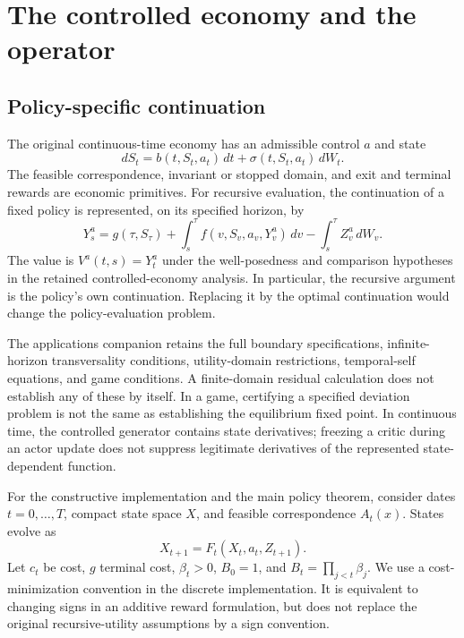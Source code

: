\documentclass[ecta,nameyear,draft]{econsocart}
\begin{document}
\section{The controlled economy and the operator}\label{sec:economy}
\subsection{Policy-specific continuation}
The original continuous-time economy has an admissible control $a$ and state
\begin{equation}\label{eq:diffusion}
 dS_t=b(t,S_t,a_t)\,dt+\sigma(t,S_t,a_t)\,dW_t.
\end{equation}
The feasible correspondence, invariant or stopped domain, and exit and terminal rewards are economic primitives. For recursive evaluation, the continuation of a fixed policy is represented, on its specified horizon, by
\[
 Y_s^a=g(\tau,S_\tau)+\int_s^\tau f(v,S_v,a_v,Y_v^a)\,dv
                 -\int_s^\tau Z_v^a\,dW_v.
\]
The value is $V^a(t,s)=Y_t^a$ under the well-posedness and comparison hypotheses in the retained controlled-economy analysis. In particular, the recursive argument is the policy's own continuation. Replacing it by the optimal continuation would change the policy-evaluation problem.

The applications companion retains the full boundary specifications, infinite-horizon transversality conditions, utility-domain restrictions, temporal-self equations, and game conditions. A finite-domain residual calculation does not establish any of these by itself. In a game, certifying a specified deviation problem is not the same as establishing the equilibrium fixed point. In continuous time, the controlled generator contains state derivatives; freezing a critic during an actor update does not suppress legitimate derivatives of the represented state-dependent function.

For the constructive implementation and the main policy theorem, consider dates $t=0,\ldots,T$, compact state space $X$, and feasible correspondence $A_t(x)$. States evolve as
\begin{equation}\label{eq:transition}
 X_{t+1}=F_t(X_t,a_t,Z_{t+1}).
\end{equation}
Let $c_t$ be cost, $g$ terminal cost, $\beta_t>0$, $B_0=1$, and $B_t=\prod_{j<t}\beta_j$. We use a cost-minimization convention in the discrete implementation. It is equivalent to changing signs in an additive reward formulation, but does not replace the original recursive-utility assumptions by a sign convention.
\end{document}
